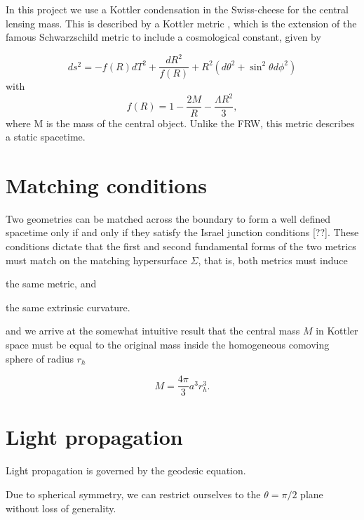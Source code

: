 In this project we use a Kottler condensation in the Swiss-cheese for the central lensing mass. This is described by a Kottler metric \citep{kottler1918physikalischen}, which is the extension of the famous Schwarzschild metric to include a cosmological constant, given by

\begin{equation}
  ds^2 = -f(R)dT^2 + \frac{dR^2}{f(R)} + R^2(d\theta^2 + \sin^2 \theta d\phi^2)
  \label{eq:kottler-metric}
\end{equation}
with
\begin{equation}
  f(R) = 1-\frac{2M}{R} - \frac{\Lambda R^2}{3},
  \label{eq:kottler-metric-f}
\end{equation}
where M is the mass of the central object. Unlike the FRW, this metric describes a static spacetime. 

\section{Matching conditions}

Two geometries can be matched across the boundary to form a well defined spacetime only if and only if they satisfy the Israel junction conditions [??]. These conditions dictate that the first and second fundamental forms of the two metrics must match on the matching hypersurface $\Sigma$, that is, both metrics must induce 
\begin{inparaenum}[(i)]
  \item the same metric, and 
  \item the same extrinsic curvature.
\end{inparaenum}



and we arrive at the somewhat intuitive result that the central mass $M$ in Kottler space must be equal to the original mass inside the homogeneous comoving sphere of radius $r_h$

\begin{equation}
  M = \frac{4\pi}{3} a^3 r_h^3. 
\end{equation}


\section{Light propagation}

Light propagation is governed by the geodesic equation. 

Due to spherical symmetry, we can restrict ourselves to the $\theta = \pi/2$ plane without loss of generality. 